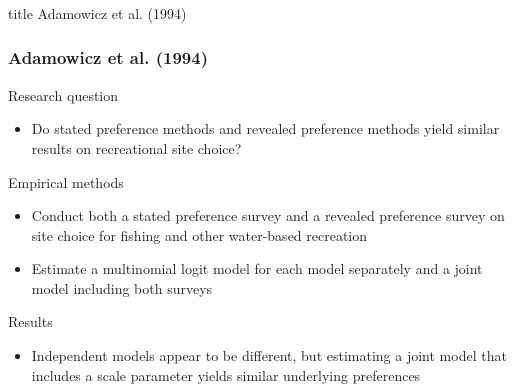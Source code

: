 \documentclass{beamer}
\begin{document}
\begin{frame}\frametitle{}
    \vfill
    \centering
    \begin{beamercolorbox}[center]{title}
        \Large Adamowicz et al. (1994)
    \end{beamercolorbox}
    \vfill
\end{frame}

\begin{frame}\frametitle{Adamowicz et al. (1994)}
    Research question
    \begin{itemize}
    	\item Do stated preference methods and revealed preference methods yield similar results on recreational site choice?
    \end{itemize}
    \vspace{2ex}
    Empirical methods
    \begin{itemize}
    	\item Conduct both a stated preference survey and a revealed preference survey on site choice for fishing and other water-based recreation
    	\item Estimate a multinomial logit model for each model separately and a joint model including both surveys
    \end{itemize}
    \vspace{2ex}
    Results
    \begin{itemize}
    	\item Independent models appear to be different, but estimating a joint model that includes a scale parameter yields similar underlying preferences
    \end{itemize}
\end{frame}
\end{document}
